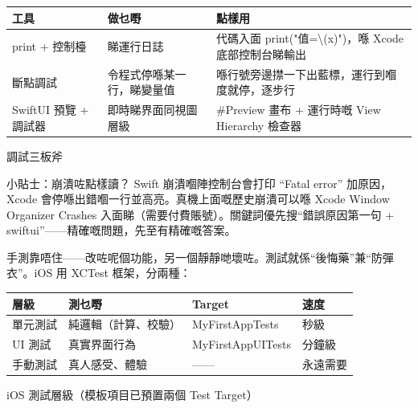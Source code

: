 


\begin{center}
\begin{tabularx}{\linewidth}{|X|X|X|}
\hline
\textbf{工具} & \textbf{做乜嘢} & \textbf{點樣用} \tabularnewline
\hline
print + 控制檯 & 睇運行日誌 & 代碼入面 print("值=\textbackslash{}(x)")，喺 Xcode 底部控制台睇輸出 \tabularnewline
斷點調試 & 令程式停喺某一行，睇變量值 & 喺行號旁邊㩒一下出藍標，運行到嗰度就停，逐步行 \tabularnewline
SwiftUI 預覽 + 調試器 & 即時睇界面同視圖層級 & \#Preview 畫布 + 運行時嘅 View Hierarchy 檢查器 \tabularnewline
\hline
\end{tabularx}
\end{center}

\begin{center}\small\color{gray}調試三板斧\end{center}

\begin{tcbinfo}{小貼士：崩潰咗點樣讀？}
Swift 崩潰嗰陣控制台會打印 “Fatal error” 加原因，Xcode 會停喺出錯嗰一行並高亮。真機上面嘅歷史崩潰可以喺 Xcode Window Organizer Crashes 入面睇（需要付費賬號）。關鍵詞優先搜“錯誤原因第一句 + swiftui”——精確嘅問題，先至有精確嘅答案。

\end{tcbinfo}


手測靠唔住——改咗呢個功能，另一個靜靜哋壞咗。測試就係“後悔藥”兼“防彈衣”。iOS 用 XCTest 框架，分兩種：

\begin{center}
\begin{tabularx}{\linewidth}{|X|X|X|X|}
\hline
\textbf{層級} & \textbf{測乜嘢} & \textbf{Target} & \textbf{速度} \tabularnewline
\hline
單元測試 & 純邏輯（計算、校驗） & MyFirstAppTests & 秒級 \tabularnewline
UI 測試 & 真實界面行為 & MyFirstAppUITests & 分鐘級 \tabularnewline
手動測試 & 真人感受、體驗 & —— & 永遠需要 \tabularnewline
\hline
\end{tabularx}
\end{center}

\begin{center}\small\color{gray}iOS 測試層級（模板項目已預置兩個 Test Target）\end{center}


